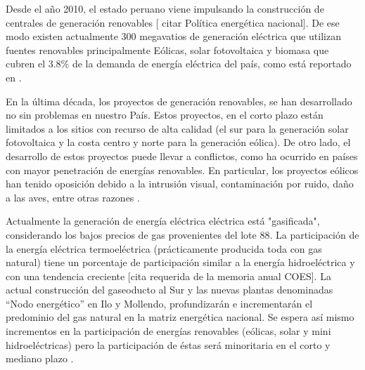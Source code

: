 Desde el año 2010, el estado peruano viene impulsando la construcción de centrales de generación renovables [ citar Política energética nacional]. De ese modo existen actualmente 300 megavatios de generación eléctrica que utilizan fuentes renovables principalmente Eólicas, solar fotovoltaica y biomasa que cubren el 3.8\% de la demanda de energía eléctrica del país, como está reportado en \citep{coes_memoria_2016}.

En la última década, los proyectos de generación renovables, se han desarrollado no sin problemas en nuestro País. Estos proyectos, en el corto plazo están limitados a los sitios con recurso de alta calidad (el sur para la generación solar fotovoltaica y la costa centro y norte para la generación eólica). De otro lado, el desarrollo de estos proyectos puede llevar a conflictos, como ha ocurrido en países con mayor penetración de energías renovables. En particular, los proyectos eólicos han tenido oposición debido a la intrusión visual, contaminación por ruido, daño a las aves, entre otras razones \citep[p.~282]{moriarty_energy_2018}.


%

Actualmente la generación de energía eléctrica eléctrica está "gasificada", considerando los bajos precios de gas provenientes  del lote 88. La participación de la energía eléctrica termoeléctrica (prácticamente producida toda con gas natural) tiene un porcentaje de participación similar a la energía hidroeléctrica y con una tendencia creciente [cita requerida de la memoria anual COES]. 
La actual construcción del gaseoducto al Sur y las nuevas plantas denominadas “Nodo energético” en Ilo y Mollendo, profundizarán e incrementarán el predominio del gas natural en la matriz energética nacional. Se espera así mismo incrementos en la participación de energías renovables (eólicas, solar y mini hidroeléctricas) pero  la participación de éstas  será minoritaria en el corto y mediano plazo \citep{coes_memoria_2016}.




